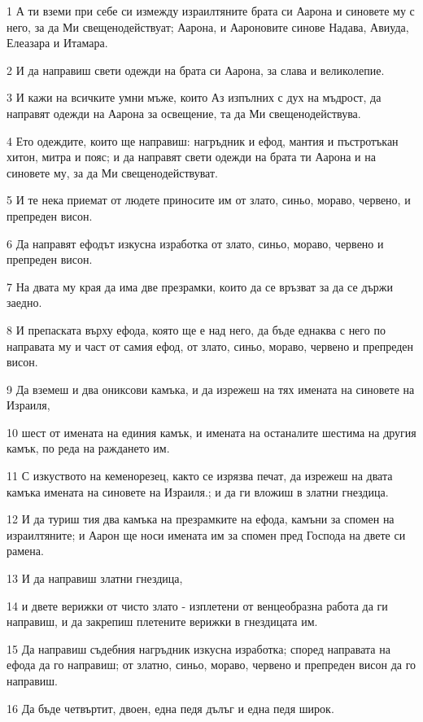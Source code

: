 \par 1 А ти вземи при себе си измежду израилтяните брата си Аарона и синовете му с него, за да Ми свещенодействуат; Аарона, и Аароновите синове Надава, Авиуда, Елеазара и Итамара.
\par 2 И да направиш свети одежди на брата си Аарона, за слава и великолепие.
\par 3 И кажи на всичките умни мъже, които Аз изпълних с дух на мъдрост, да направят одежди на Аарона за освещение, та да Ми свещенодействува.
\par 4 Ето одеждите, които ще направиш: нагръдник и ефод, мантия и пъстротъкан хитон, митра и пояс; и да направят свети одежди на брата ти Аарона и на синовете му, за да Ми свещенодействуват.
\par 5 И те нека приемат от людете приносите им от злато, синьо, мораво, червено, и препреден висон.
\par 6 Да направят ефодът изкусна изработка от злато, синьо, мораво, червено и препреден висон.
\par 7 На двата му края да има две презрамки, които да се връзват за да се държи заедно.
\par 8 И препаската върху ефода, която ще е над него, да бъде еднаква с него по направата му и част от самия ефод, от злато, синьо, мораво, червено и препреден висон.
\par 9 Да вземеш и два ониксови камъка, и да изрежеш на тях имената на синовете на Израиля,
\par 10 шест от имената на единия камък, и имената на останалите шестима на другия камък, по реда на раждането им.
\par 11 С изкуството на кеменорезец, както се изрязва печат, да изрежеш на двата камъка имената на синовете на Израиля.; и да ги вложиш в златни гнездица.
\par 12 И да туриш тия два камъка на презрамките на ефода, камъни за спомен на израилтяните; и Аарон ще носи имената им за спомен пред Господа на двете си рамена.
\par 13 И да направиш златни гнездица,
\par 14 и двете верижки от чисто злато - изплетени от венцеобразна работа да ги направиш, и да закрепиш плетените верижки в гнездицата им.
\par 15 Да направиш съдебния нагръдник изкусна изработка; според направата на ефода да го направиш; от златно, синьо, мораво, червено и препреден висон да го направиш.
\par 16 Да бъде четвъртит, двоен, една педя дълъг и една педя широк.
